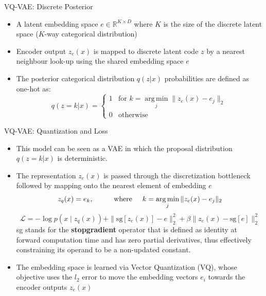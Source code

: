 \begin{frame}[allowframebreaks]{VQ-VAE: Discrete Posterior}

\begin{itemize}
    \item A latent embedding space $e \in \mathbb{R}^{K \times D}$ where $K$ is the size of the discrete latent space ($K$-way categorical distribution)
    \item  Encoder output $z_e(x)$ is mapped to discrete latent code $z$ by a nearest neighbour look-up using the shared embedding space $e$
    \item The posterior categorical distribution $q(z|x)$ probabilities are defined as one-hot as:
    \[ q(z = k|x) = \begin{cases}
          1 & \text{for } k = \operatorname*{arg\,min}_j \|z_e(x) - e_j\|_2 \\
          0 & \text{otherwise}
       \end{cases}
    \]
\end{itemize}
\end{frame}

\begin{frame}[allowframebreaks]{VQ-VAE: Quantization and Loss}
\begin{itemize}
    \item  This model can be seen as a VAE in which the proposal distribution $q(z = k|x)$ is deterministic.
    \item The representation $z_e(x)$ is passed through the discretization bottleneck followed by mapping onto the nearest element of embedding $e$\\
    \[ z_q(x) = e_k, \hspace{1cm} \text{where} \hspace{0.5cm} k = \operatorname*{arg\,min}_j \|z_e(x) - e_j\|_2 \]
    \[ \mathcal{L} = -\log p(x \mid z_q(x)) + \|\mathrm{sg}[z_e(x)] - e\|^2_2 + \beta \|z_e(x) - \mathrm{sg}[e]\|_2^2 \]
    sg stands for the \textbf{stopgradient} operator that is defined as identity at forward computation time and has zero partial derivatives, thus effectively constraining its operand to be a non-updated constant.
    \item The embedding space is learned via Vector Quantization (VQ), whose objective uses the $l_2$ error to move the embedding vectors $e_i$ towards the encoder outputs $z_e(x)$

\end{itemize}
\end{frame}

